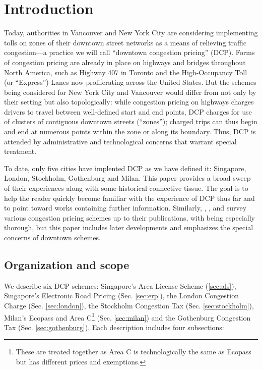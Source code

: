 \section{Introduction}

Today, authorities in Vancouver and New York City are considering implementing tolls on zones of their downtown street networks as a means of relieving traffic congestion---a practice we will call ``downtown congestion pricing'' (DCP). Forms of congestion pricing are already in place on highways and bridges throughout North America, such as Highway 407 in Toronto and the High-Occupancy Toll (or ``Express'') Lanes now proliferating across the United States. But the schemes being considered for New York City and Vancouver would differ from not only by their setting but also topologically: while congestion pricing on highways charges drivers to travel between well-defined start and end points, DCP charges for use of  clusters of contiguous downtown streets (``zones''); charged trips can thus begin and end at numerous points within the zone or along its boundary. Thus, DCP is attended by administrative and technological concerns that warrant special treatment.

To date, only five cities have implented DCP as we have defined it: Singapore, London, Stockholm, Gothenburg and Milan. This paper provides a broad sweep of their experiences along with some historical connective tissue. The goal is to help the reader quickly become familiar with the experience of DCP thus far and to point toward works containing further information. Similarly, \citet{Hau1992}, \citet{Gomez-Ibanez1994}, \citet{Small1998} and \citet{Anas2011} survey various congestion pricing schemes up to their publications, with \citet{Gomez-Ibanez1994} being especially thorough, but this paper includes later developments and emphasizes the special concerns of downtown schemes.

\subsection{Organization and scope}

We describe six DCP schemes: Singapore's Area License Scheme (\ref{sec:als}), Singapore's Electronic Road Pricing (Sec. \ref{sec:erp}), the London Congestion Charge (Sec. \ref{sec:london}), the Stockholm Congestion Tax (Sec. \ref{sec:stockholm}), Milan's Ecopass and Area C\footnote{These are treated together as Area C is technologically the same as Ecopass but has different prices and exemptions.} (Sec. \ref{sec:milan}) and the Gothenburg Congestion Tax (Sec. \ref{sec:gothenburg}). Each description includes four subsections:

